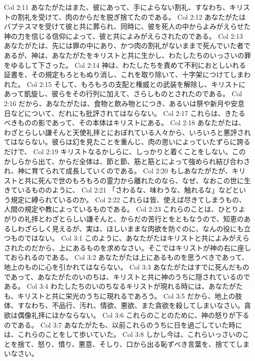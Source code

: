 Col 2:11  あなたがたはまた、彼にあって、手によらない割礼、すなわち、キリストの割礼を受けて、肉のからだを脱ぎ捨てたのである。
Col 2:12  あなたがたはバプテスマを受けて彼と共に葬られ、同時に、彼を死人の中からよみがえらせた神の力を信じる信仰によって、彼と共によみがえらされたのである。
Col 2:13  あなたがたは、先には罪の中にあり、かつ肉の割礼がないままで死んでいた者であるが、神は、あなたがたをキリストと共に生かし、わたしたちのいっさいの罪をゆるして下さった。
Col 2:14  神は、わたしたちを責めて不利におとしいれる証書を、その規定もろともぬり消し、これを取り除いて、十字架につけてしまわれた。
Col 2:15  そして、もろもろの支配と権威との武装を解除し、キリストにあって凱旋し、彼らをその行列に加えて、さらしものとされたのである。
Col 2:16  だから、あなたがたは、食物と飲み物とにつき、あるいは祭や新月や安息日などについて、だれにも批評されてはならない。
Col 2:17  これらは、きたるべきものの影であって、その本体はキリストにある。
Col 2:18  あなたがたは、わざとらしい謙そんと天使礼拝とにおぼれている人々から、いろいろと悪評されてはならない。彼らは幻を見たことを重んじ、肉の思いによっていたずらに誇るだけで、
Col 2:19  キリストなるかしらに、しっかりと着くことをしない。このかしらから出て、からだ全体は、節と節、筋と筋とによって強められ結び合わされ、神に育てられて成長していくのである。
Col 2:20  もしあなたがたが、キリストと共に死んで世のもろもろの霊力から離れたのなら、なぜ、なおこの世に生きているもののように、
Col 2:21  「さわるな、味わうな、触れるな」などという規定に縛られているのか。
Col 2:22  これらは皆、使えば尽きてしまうもの、人間の規定や教によっているものである。
Col 2:23  これらのことは、ひとりよがりの礼拝とわざとらしい謙そんと、からだの苦行とをともなうので、知恵のあるしわざらしく見えるが、実は、ほしいままな肉欲を防ぐのに、なんの役にも立つものではない。
Col 3:1  このように、あなたがたはキリストと共によみがえらされたのだから、上にあるものを求めなさい。そこではキリストが神の右に座しておられるのである。
Col 3:2  あなたがたは上にあるものを思うべきであって、地上のものに心を引かれてはならない。
Col 3:3  あなたがたはすでに死んだものであって、あなたがたのいのちは、キリストと共に神のうちに隠されているのである。
Col 3:4  わたしたちのいのちなるキリストが現れる時には、あなたがたも、キリストと共に栄光のうちに現れるであろう。
Col 3:5  だから、地上の肢体、すなわち、不品行、汚れ、情欲、悪欲、また貪欲を殺してしまいなさい。貪欲は偶像礼拝にほかならない。
Col 3:6  これらのことのために、神の怒りが下るのである。
Col 3:7  あなたがたも、以前これらのうちに日を過ごしていた時には、これらのことをして歩いていた。
Col 3:8  しかし今は、これらいっさいのことを捨て、怒り、憤り、悪意、そしり、口から出る恥ずべき言葉を、捨ててしまいなさい。
